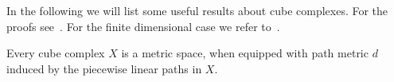 


In the following we will list some useful results about cube complexes. For the proofs see~\cite[Appendices A, B]{MR3029427}. For the finite dimensional case we refer to~\cite[Sec. I.7, II.5]{MR1744486}.

\begin{thm}[{\cite[I.7.10]{MR1744486}}]
  \label{thm:metric}
  Every cube complex \(X\) is a metric space, when equipped with path metric \(d\) induced by the piecewise linear paths in \(X\).
\end{thm}

